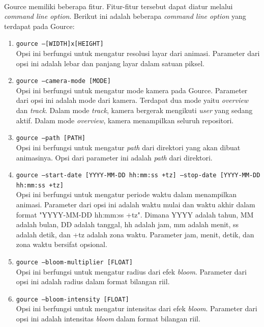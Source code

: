 \ \\
Gource memiliki beberapa fitur. Fitur-fitur tersebut dapat diatur melalui \textit{command line option}. Berikut ini adalah beberapa \textit{command line option} yang terdapat pada Gource:
\begin{enumerate}
\item \texttt{gource --[WIDTH]x[HEIGHT]}\\
Opsi ini berfungsi untuk mengatur resolusi layar dari animasi. Parameter dari opsi ini adalah lebar dan panjang layar dalam satuan piksel. 

\item \texttt{gource --camera-mode [MODE]}\\
Opsi ini berfungsi untuk mengatur mode kamera pada Gource. Parameter dari opsi ini adalah mode dari kamera. Terdapat dua mode yaitu \textit{overview} dan \textit{track}. Dalam mode \textit{track}, kamera bergerak mengikuti \textit{user} yang sedang aktif. Dalam mode \textit{overview}, kamera menampilkan seluruh repositori.

\item \texttt{gource --path [PATH]}\\
Opsi ini berfungsi untuk mengatur \textit{path} dari direktori yang akan dibuat animasinya. Opsi dari parameter ini adalah \textit{path} dari direktori.

\item \texttt{gource --start-date [YYYY-MM-DD hh:mm:ss +tz] --stop-date [YYYY-MM-DD hh:mm:ss +tz]}\\
Opsi ini berfungsi untuk mengatur periode waktu dalam menampilkan animasi. Parameter dari opsi ini adalah waktu mulai dan waktu akhir dalam format "YYYY-MM-DD hh:mm:ss +tz". Dimana YYYY adalah tahun, MM adalah bulan, DD adalah tanggal, hh adalah jam, mm adalah menit, ss adalah detik, dan +tz adalah zona waktu. Parameter jam, menit, detik, dan zona waktu bersifat opsional.    

\item \texttt{gource --bloom-multiplier [FLOAT] }\\
Opsi ini berfungsi untuk mengatur radius dari efek \textit{bloom}. Parameter dari opsi ini adalah radius dalam format bilangan riil.

\item \texttt{gource --bloom-intensity [FLOAT]}\\
Opsi ini berfungsi untuk mengatur intensitas dari efek \textit{bloom}. Parameter dari opsi ini adalah intensitas \textit{bloom} dalam format bilangan riil.


\end{enumerate}
